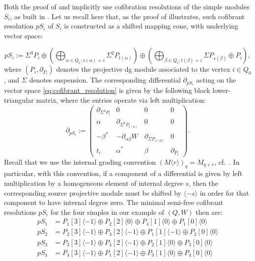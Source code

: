 \noindent Both the proof of  and  implicitly use cofibration resolutions of the simple modules $S_i$, as built in \cite[Section 2.14]{KellerYang}. Let us recall here that, as the proof of \cite[Section 3.12]{KellerYang} illustrates, such cofibrant resolution $pS_i$ of $S_i$ is constructed as a shifted mapping cone, with underlying vector space:

\begin{equation}\label{eq:cofibrant_resolution}
pS_i := \Sigma^3 P_i \oplus \left(\bigoplus_{\alpha \in Q_1: s(\alpha)=i} \Sigma^2 P_{t(\alpha)}\right) \oplus \left(\bigoplus_{\beta \in Q_1: t(\beta)=i} \Sigma P_{s(\beta)} \oplus P_i\right),
\end{equation}
where $(P_i,\partial_{P_i})$ denotes the projective dg module associated to the vertex $i\in Q_0$, and $\Sigma$ denotes suspension. The corresponding differential $\partial_{pS_i}$ acting on the vector space \eqref{eq:cofibrant_resolution} is given by the following block lower-triangular matrix, where the entries operate via left multiplication:
\begin{equation}\label{eq:cofibration_resolution_differential}
\partial_{pS_i} := \begin{pmatrix} 
\partial_{\Sigma^3 P_i} & 0 & 0 & 0 \\ 
\alpha & \partial_{\Sigma^2 P_{t(\alpha)}} & 0 & 0 \\ 
-\beta^* & -\partial_{\alpha\beta}W & \partial_{\Sigma P_{s(\beta)}} & 0 \\ 
t_i & \alpha^* & \beta & \partial_{P_i} 
\end{pmatrix}.
\end{equation}
Recall that we use the internal grading convention $(M\langle r \rangle)_{q} = M_{q+r}$,  cf.~. In particular, with this convention, if a component of a differential is given by left multiplication by a homogeneous element of internal degree $s$, then the corresponding source projective module must be shifted by
$\langle-s\rangle$ in order for that component to have
internal degree zero. The minimal semi-free cofibrant resolutions $pS_i$ for the four simples in our example of $(Q,W)$ then are:
\begin{align*}
pS_1 &= P_1[3]\langle -1 \rangle \oplus P_2[2]\langle 0 \rangle \oplus P_4[1]\langle 0 \rangle \oplus P_1[0]\langle 0 \rangle \\
pS_2 &= P_2[3]\langle -1 \rangle \oplus P_3[2]\langle -1 \rangle \oplus P_1[1]\langle -1 \rangle \oplus P_2[0]\langle 0 \rangle \\
pS_3 &= P_3[3]\langle -1 \rangle \oplus P_4[2]\langle -1 \rangle \oplus P_2[1]\langle 0 \rangle \oplus P_3[0]\langle 0 \rangle \\
pS_4 &= P_4[3]\langle -1 \rangle \oplus P_1[2]\langle -1 \rangle \oplus P_3[1]\langle 0 \rangle \oplus P_4[0]\langle 0 \rangle
\end{align*}



